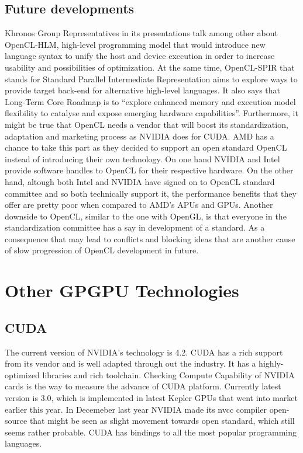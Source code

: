 \subsection{Future developments}
Khronos Group Representatives in its presentations talk among other about OpenCL-HLM, high-level programming model that would introduce new language syntax to unify the host and device execution in order to increase usability and possibilities of optimization. At the same time, OpenCL-SPIR that stands for Standard Parallel Intermediate Representation aims to explore ways to provide target back-end for alternative high-level languages. It also says that Long-Term Core Roadmap is to \enquote{explore enhanced memory and execution model flexibility to catalyse and expose emerging hardware capabilities}. Furthermore, it might be true that OpenCL needs a vendor that will boost its standardization, adaptation and marketing process as NVIDIA does for CUDA. AMD has a chance to take this part as they decided to support an open standard OpenCL instead of introducing their own technology. On one hand NVIDIA and Intel provide software handles to OpenCL for their respective hardware. On the other hand, altough both Intel and NVIDIA have signed on to OpenCL standard committee and so both technically support it, the performance benefits that they offer are pretty poor when compared to AMD's APUs and GPUs. Another downside to OpenCL, similar to the one with OpenGL, is that everyone in the standardization committee has a say in development of a standard. As a consequence that may lead to conflicts and blocking ideas that are another cause of slow progression of OpenCL development in future.\cite{khronos2012cloverview}


\section{Other GPGPU Technologies}
\subsection{CUDA}
The current version of NVIDIA's technology is 4.2. CUDA has a rich support from its vendor and is well adapted through out the industry. It has a highly-optimized libraries and rich toolchain. Checking Compute Capability of NVIDIA cards is the way to measure the advance of CUDA platform. Currently latest version is 3.0, which is implemented in latest Kepler GPUs that went into market earlier this year. In Decemeber last year NVIDIA made its nvcc compiler open-source that might be seen as slight movement towards open standard, which still seems rather probable.\cite{hpcwire2012nvidia} CUDA has bindings to all the most popular programming languages.

